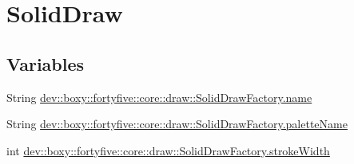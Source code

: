 \hypertarget{group___solid_draw}{
\section{SolidDraw}
\label{d7/d32/group___solid_draw}
}
\subsection*{Variables}
\begin{DoxyCompactItemize}
\item 
String \hyperlink{group___solid_draw_ga2d76fd9b9b039a2df1d3a2fd1e7c2ceb}{dev::boxy::fortyfive::core::draw::SolidDrawFactory.name}
\item 
String \hyperlink{group___solid_draw_ga294947fca0b2ad2e755107ec48d1af5e}{dev::boxy::fortyfive::core::draw::SolidDrawFactory.paletteName}
\item 
int \hyperlink{group___solid_draw_ga6a9bdc83f9a995edf6d728c0834f0aea}{dev::boxy::fortyfive::core::draw::SolidDrawFactory.strokeWidth}
\end{DoxyCompactItemize}


